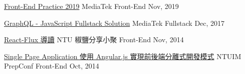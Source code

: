 
\begin{cvhonors}

  \cvhonor
    {\href{https://speakerdeck.com/evenchange4/front-end-practice-2019}{Front-End Practice 2019}} %
    {MediaTek} %
    {Front-End} %
    {Nov, 2019} %

  \cvhonor
    {\href{https://speakerdeck.com/evenchange4/graphql-javascript-fullstack-solution}{GraphQL - JavaScript Fullstack Solution}} %
    {MediaTek} %
    {Fullstack} %
    {Dec, 2017} %

  \cvhonor
    {\href{https://slides.com/evenchange4/react-flux-intro}{React-Flux 導讀}} %
    {NTU 椒鹽分享小聚} %
    {Front-End} %
    {Nov, 2014} %

  \cvhonor
    {\href{https://slides.com/evenchange4/2014-ntuim-prepconf}{Single Page Application 使用 Angular.js 實現前後端分離式開發模式}} %
    {NTUIM PrepConf} %
    {Front-End} %
    {Oct, 2014} %

\end{cvhonors}
